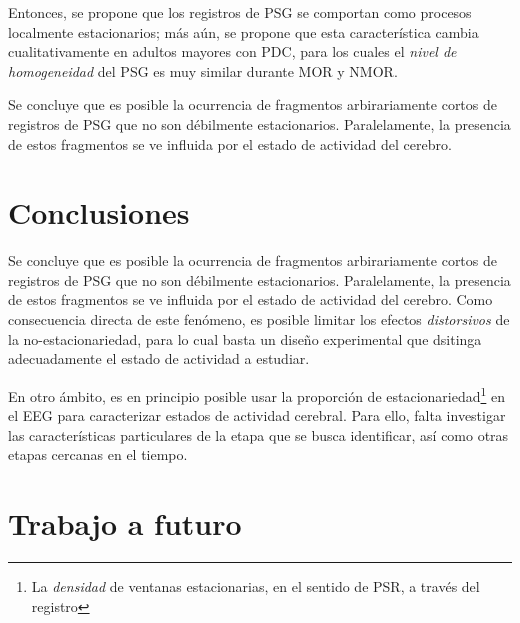 Entonces, se propone que los registros de PSG se comportan como procesos localmente estacionarios; 
más aún, se propone que esta característica cambia cualitativamente en adultos mayores con PDC,
para los cuales el \textit{nivel de homogeneidad} del PSG es muy similar durante MOR y NMOR.

Se concluye que
es posible la ocurrencia de fragmentos arbirariamente cortos de registros de PSG que no 
son débilmente estacionarios. Paralelamente, la presencia de estos fragmentos se ve influida por el
estado de actividad del cerebro.


\section{Conclusiones}

Se concluye que
es posible la ocurrencia de fragmentos arbirariamente cortos de registros de PSG que no 
son débilmente estacionarios. Paralelamente, la presencia de estos fragmentos se ve influida por el
estado de actividad del cerebro.
%
Como consecuencia directa de este fenómeno, es posible limitar los efectos \textit{distorsivos} de 
la no-estacionariedad, para lo cual basta un diseño experimental que dsitinga adecuadamente el
estado de actividad a estudiar. 

En otro ámbito, es en principio posible usar la
proporción de estacionariedad\footnote{La \textit{densidad} de ventanas estacionarias, en el sentido de
PSR, a través del registro} en el EEG para caracterizar estados de actividad cerebral. Para ello, falta 
investigar las características particulares de la etapa que se busca identificar, así como otras
etapas cercanas en el tiempo.


\section{Trabajo a futuro}

